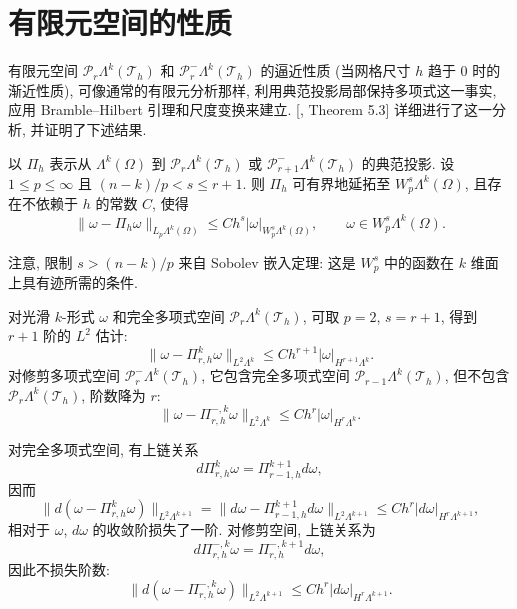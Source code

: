 \section{有限元空间的性质}\label{sec:finite-element-space-properties}

有限元空间 $\mathcal P_r\Lambda^k(\mathcal T_h)$ 和 $\mathcal P_r^-\Lambda^k(\mathcal T_h)$ 的逼近性质 (当网格尺寸 $h$ 趋于 $0$ 时的渐近性质), 可像通常的有限元分析那样, 利用典范投影局部保持多项式这一事实, 应用 Bramble–Hilbert 引理和尺度变换来建立. [, Theorem 5.3] 详细进行了这一分析, 并证明了下述结果.

\begin{Theorem}\label{thm:canonical-projection-approximation}
以 $\Pi_h$ 表示从 $\Lambda^k(\Omega)$ 到 $\mathcal P_r\Lambda^k(\mathcal T_h)$ 或 $\mathcal P_{r+1}^-\Lambda^k(\mathcal T_h)$ 的典范投影. 设 $1\leq p\leq\infty$ 且 $(n-k)/p<s\leq r+1$. 则 $\Pi_h$ 可有界地延拓至 $W_p^s\Lambda^k(\Omega)$, 且存在不依赖于 $h$ 的常数 $C$, 使得
\[
\|\omega-\Pi_h\omega\|_{L_p\Lambda^k(\Omega)}\leq Ch^s|\omega|_{W_p^s\Lambda^k(\Omega)},\qquad\omega\in W_p^s\Lambda^k(\Omega).
\]
\end{Theorem}

注意, 限制 $s>(n-k)/p$ 来自 Sobolev 嵌入定理: 这是 $W_p^s$ 中的函数在 $k$ 维面上具有迹所需的条件.

对光滑 $k$-形式 $\omega$ 和完全多项式空间 $\mathcal P_r\Lambda^k(\mathcal T_h)$, 可取 $p=2$, $s=r+1$, 得到 $r+1$ 阶的 $L^2$ 估计:
\[
\|\omega-\Pi_{r,h}^k\omega\|_{L^2\Lambda^k}\leq Ch^{r+1}|\omega|_{H^{r+1}\Lambda^k}.
\]
对修剪多项式空间 $\mathcal P_r^-\Lambda^k(\mathcal T_h)$, 它包含完全多项式空间 $\mathcal P_{r-1}\Lambda^k(\mathcal T_h)$, \newline 但不包含 $\mathcal P_r\Lambda^k(\mathcal T_h)$, 阶数降为 $r$:
\[
\|\omega-\Pi_{r,h}^{-,k}\omega\|_{L^2\Lambda^k}\leq Ch^r|\omega|_{H^r\Lambda^k}.
\]

对完全多项式空间, 有上链关系
\[
d\Pi_{r,h}^k\omega=\Pi_{r-1,h}^{k+1}d\omega,
\]
因而
\[
\|d(\omega-\Pi_{r,h}^k\omega)\|_{L^2\Lambda^{k+1}}=\|d\omega-\Pi_{r-1,h}^{k+1}d\omega\|_{L^2\Lambda^{k+1}}\leq Ch^r|d\omega|_{H^r\Lambda^{k+1}},
\]
相对于 $\omega$, $d\omega$ 的收敛阶损失了一阶. 对修剪空间, 上链关系为
\[
d\Pi_{r,h}^{-,k}\omega=\Pi_{r,h}^{-,k+1}d\omega,
\]
因此不损失阶数:
\[
\|d(\omega-\Pi_{r,h}^{-,k}\omega)\|_{L^2\Lambda^{k+1}}\leq Ch^r|d\omega|_{H^r\Lambda^{k+1}}.
\]


